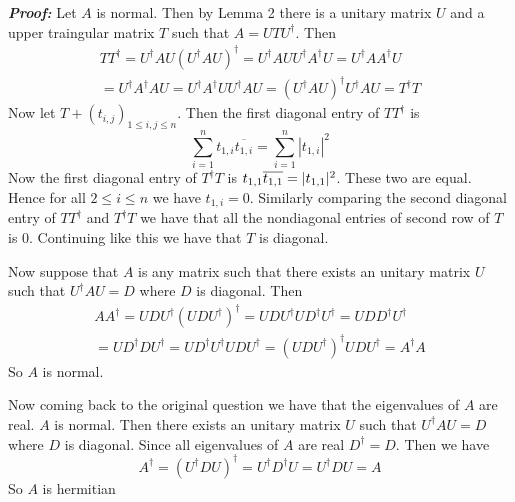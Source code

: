 \documentclass[a4paper, 11pt]{article}
\begin{document}
{	\textbf{\textit{Proof:}} Let $A$ is normal. Then by Lemma 2 there  is a unitary matrix $U$ and a upper traingular matrix $T$ such that $A=UTU^{\dagger}$. Then \begin{multline*}
		TT^{\dagger}=U^{\dagger}AU(U^{\dagger}AU)^{\dagger}=U^{\dagger}AUU^{\dagger} A^{\dagger} U	=U^{\dagger}A A^{\dagger} U\\
	=U^{\dagger} A^{\dagger}A U=U^{\dagger} A^{\dagger}UU^{\dagger}A U=(U^{\dagger}AU)^{\dagger}U^{\dagger}AU=T^{\dagger}T
	\end{multline*}Now let $T+(t_{i,j})_{1\leq i,j\leq n}$. Then the first diagonal entry of $TT^{\dagger}$ is $$\sum_{i=1}^n  t_{1,i} \overline{t_{1,i}}=\sum_{i=1}^n |t_{1,i}|^2$$ Now the first diagonal entry of $T^{\dagger}T$ is $t_{1,1}\overline{t_{1,1}}=|t_{1,1}|^2$. These two are equal. Hence for all $2\leq i\leq n$ we have $t_{1,i}=0$. Similarly comparing the second diagonal entry of $TT^{\dagger} $ and $T^{\dagger}T$ we have that all the nondiagonal entries of second row of $T$ is 0.  Continuing like this we have that $T$ is diagonal. 
	
	Now suppose that $A$ is any matrix such that there exists an unitary matrix $U$ such that  $U^{\dagger}AU=D$ where $D$ is diagonal. Then \begin{multline*}
		AA^{\dagger}=UDU^{\dagger}(UDU^{\dagger})^{\dagger}=UDU^{\dagger}UD^{\dagger}U^{\dagger}=UDD^{\dagger}U^{\dagger}\\
		=UD^{\dagger}DU^{\dagger}=UD^{\dagger}U^{\dagger}UDU^{\dagger}=(UDU^{\dagger})^{\dagger}UDU^{\dagger}=A^{\dagger}A
	\end{multline*}So $A$ is normal.
	
	
	\parinn
	
	Now coming back to the original question we have that the eigenvalues of $A$ are real. $A$ is normal. Then  there exists an unitary matrix $U$ such that  $U^{\dagger}AU=D$ where $D$ is diagonal. Since all eigenvalues of $A$ are real $D^{\dagger}=D$. Then we have $$A^{\dagger}=(U^{\dagger}DU)^{\dagger}=U^{\dagger}D^{\dagger}U=U^{\dagger}DU=A$$So $A$ is hermitian
	
	\vspace{5mm}
	
}
\end{document}

